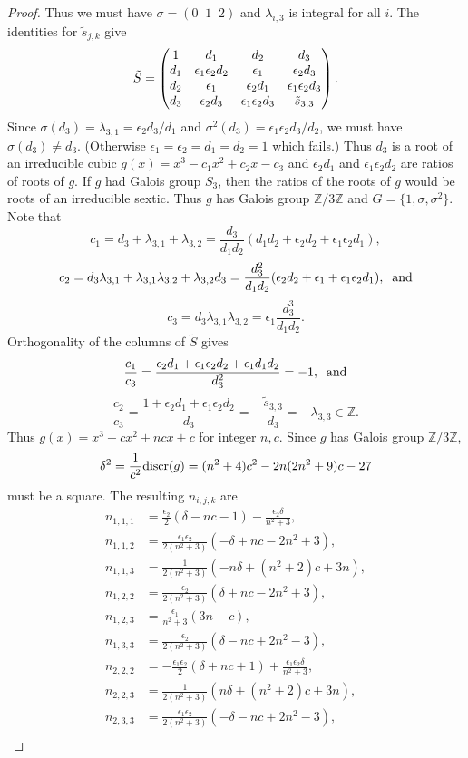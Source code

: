 \documentclass[12pt,psamsfonts]{amsart}
\newcommand{\e}{{\epsilon}}
\newcommand{\Z}{\mathbb Z}
\numberwithin{equation}{section}
\theoremstyle{definition}
\begin{document}
\begin{proof}
Thus we must have $\sigma=(0\;\; 1\;\; 2)$ and $\lambda_{i,3}$ is
integral for all $i$. The identities for $\tilde s_{j,k}$ give
$$\tilde S=\left(\begin{matrix} 1 & d_1 & d_2 & d_3\cr d_1 & \e_1\e_2 d_2 &
\e_1 & \e_2 d_3\cr d_2 & \e_1 & \e_2 d_1 & \e_1 \e_2 d_3\cr d_3 &
\e_2 d_3 & \e_1 \e_2 d_3 & \tilde s_{3,3}\end{matrix}\right).$$
Since $\sigma(d_3)=\lambda_{3,1}=\e_2 d_3/d_1$ and
$\sigma^2(d_3)=\e_1 \e_2 d_3/d_2$, we must have $\sigma(d_3)\ne
d_3$. (Otherwise $\e_1=\e_2=d_1=d_2=1$ which fails.) Thus $d_3$ is
a root of an irreducible cubic $g(x)=x^3-c_1x^2+c_2 x-c_3$ and
$\e_2 d_1$ and $\e_1\e_2 d_2$ are ratios of roots of $g$. If $g$
had Galois group $S_3$, then the ratios of the roots of $g$ would
be roots of an irreducible sextic. Thus $g$ has Galois group
$\Z/3\Z$ and $G=\{1,\sigma,\sigma^2\}$. Note that
$$c_1=d_3+\lambda_{3,1}+\lambda_{3,2}=
\frac{d_3}{d_1d_2} (d_1d_2+\e_2 d_2+\e_1\e_2 d_1),$$
$$c_2=d_3\lambda_{3,1}+\lambda_{3,1}\lambda_{3,2}+\lambda_{3,2}d_3=
\frac{d_3^2}{d_1d_2} (\e_2 d_2+\e_1+\e_1\e_2 d_1),\;\; {\rm and}$$
$$c_3=d_3 \lambda_{3,1} \lambda_{3,2}= \e_1 \frac{d_3^3}{d_1d_2}.$$
Orthogonality of the columns of $\tilde S$ gives
$$\frac{c_1}{c_3}=\frac{\e_2d_1+\e_1\e_2d_2+\e_1 d_1d_2}{d_3^2} =-1,\;\;
{\rm and}$$
$$\frac{c_2}{c_3}=\frac{1+\e_2 d_1+\e_1 \e_2 d_2}{d_3} =
-\frac{\tilde s_{3,3}}{d_3}=-\lambda_{3,3}\in \Z.$$ Thus
$g(x)=x^3-c x^2 + n c x + c$ for integer $n, c$. Since $g$ has
Galois group $\Z/3\Z$,
$$\delta^2 = \frac{1}{c^2} {\rm discr}(g) = (n^2+4)c^2 - 2n(2n^2+9)c-27$$
must be a square. The resulting $n_{i,j,k}$ are
\begin{equation*}\begin{split}
n_{1,1,1} & = \frac{\e_2}{2}(\delta-nc-1)-\frac{\e_2\delta}{n^2+3},\\
n_{1,1,2} & = \frac{\e_1\e_2}{2(n^2+3)}(-\delta+nc-2n^2+3),\\
n_{1,1,3} & = \frac{1}{2(n^2+3)}(-n\delta+(n^2+2)c+3n),\\
n_{1,2,2} & = \frac{\e_2}{2(n^2+3)}(\delta+nc-2n^2+3),\\
n_{1,2,3} & = \frac{\e_1}{n^2+3}(3n-c),\\
n_{1,3,3} & = \frac{\e_2}{2(n^2+3)}(\delta-nc+2n^2-3),\\
n_{2,2,2} & = -\frac{\e_1\e_2}{2}(\delta+nc+1)+\frac{\e_1\e_2\delta}{n^2+3},\\
n_{2,2,3} & = \frac{1}{2(n^2+3)}(n\delta+(n^2+2)c+3n),\\
n_{2,3,3} & = \frac{\e_1\e_2}{2(n^2+3)}(-\delta-nc+2n^2-3),\\

\end{split}
\end{equation*}
\end{proof}
\end{document}
